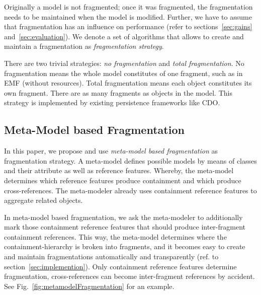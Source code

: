 Originally a model is not fragmented; once it was fragmented, the fragmentation needs to be maintained when the model is modified. Further, we have to assume that fragmentation has an influence on performance (refer to sections~\ref{sec:gains} and~\ref{sec:evaluation}). We denote a set of algorithms that allows to create and maintain a fragmentation as \emph{fragmentation strategy}.

There are two trivial strategies: \emph{no fragmentation} and \emph{total fragmentation}. No fragmentation means the whole model constitutes of one fragment, such as in EMF (without resources). Total fragmentation means each object constitutes its own fragment. There are as many fragments as objects in the model. This strategy is implemented by existing persistence frameworks like CDO.

\subsection{Meta-Model based Fragmentation}

In this paper, we propose and use \emph{meta-model based fragmentation} as fragmentation strategy. A meta-model defines possible models by means of classes and their attribute as well as reference features. Whereby, the meta-model determines which reference features produce containment and which produce cross-references. The meta-modeler already uses containment reference features to aggregate related objects.

In meta-model based fragmentation, we ask the meta-modeler to additionally mark those containment reference features that should produce inter-fragment containment references. 
This way, the meta-model determines where the containment-hierarchy is broken into fragments, and it becomes easy to create and maintain fragmentations automatically and transparently (ref. to section~\ref{sec:implemention}). Only containment reference features determine fragmentation, cross-references can become inter-fragment references by accident. See Fig.~\ref{fig:metamodelFragmentation} for an example.



